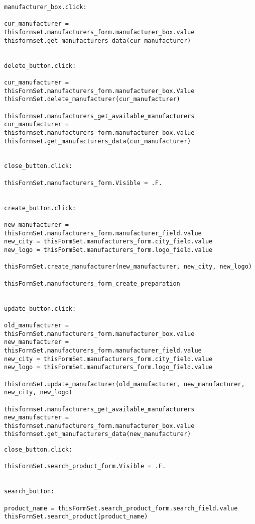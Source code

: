 \begin{lstlisting}[caption=manufacturers\_form procedures]
manufacturer_box.click:

cur_manufacturer = thisformset.manufacturers_form.manufacturer_box.value
thisformset.get_manufacturers_data(cur_manufacturer)


delete_button.click:

cur_manufacturer = thisFormSet.manufacturers_form.manufacturer_box.Value
thisFormSet.delete_manufacturer(cur_manufacturer)

thisformset.manufacturers_get_available_manufacturers
cur_manufacturer = thisformset.manufacturers_form.manufacturer_box.value
thisformset.get_manufacturers_data(cur_manufacturer)


close_button.click:

thisFormSet.manufacturers_form.Visible = .F.


create_button.click:

new_manufacturer = thisFormSet.manufacturers_form.manufacturer_field.value
new_city = thisFormSet.manufacturers_form.city_field.value
new_logo = thisFormSet.manufacturers_form.logo_field.value

thisFormSet.create_manufacturer(new_manufacturer, new_city, new_logo) 

thisFormSet.manufacturers_form_create_preparation


update_button.click:

old_manufacturer = thisFormSet.manufacturers_form.manufacturer_box.value
new_manufacturer = thisFormSet.manufacturers_form.manufacturer_field.value
new_city = thisFormSet.manufacturers_form.city_field.value
new_logo = thisFormSet.manufacturers_form.logo_field.value

thisFormSet.update_manufacturer(old_manufacturer, new_manufacturer, new_city, new_logo) 

thisformset.manufacturers_get_available_manufacturers
new_manufacturer = thisformset.manufacturers_form.manufacturer_box.value
thisformset.get_manufacturers_data(new_manufacturer)
\end{lstlisting}

\begin{lstlisting}[caption=product\_search\_form procedures]
close_button.click:

thisFormSet.search_product_form.Visible = .F.


search_button:

product_name = thisFormSet.search_product_form.search_field.value
thisFormSet.search_product(product_name)
\end{lstlisting}

